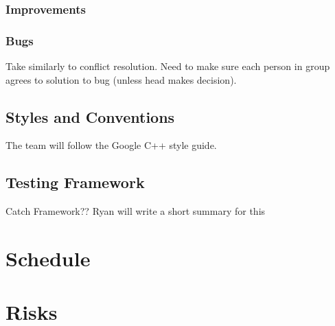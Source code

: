 \documentclass[11pt, titlepage]{article}
\begin{document}
    \subsubsection{Improvements}
    
    \subsubsection{Bugs} 
   	
    	Take similarly to conflict resolution.  Need to make sure each person in group agrees to solution to bug (unless head makes decision).
    
    \subsection{Styles and Conventions}
    	The team will follow the Google C++ style guide.
    
    \subsection{Testing Framework}
    	Catch Framework??
	    Ryan will write a short summary for this
    \section{Schedule}
    
    
    \section{Risks}
    
\end{document}
